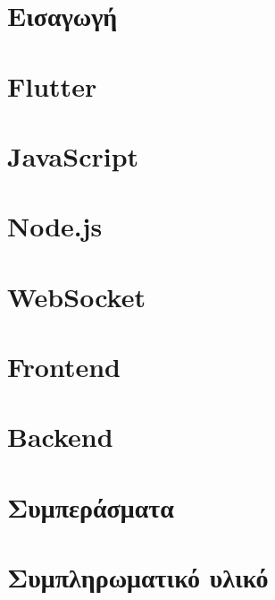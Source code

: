 \documentclass[a4paper, 11pt]{report}
\begin{document}
\chapter{Εισαγωγή}


\chapter{Flutter}


\chapter{JavaScript}


\chapter{Node.js}


\chapter{WebSocket}


\chapter{Frontend}


\chapter{Backend}

\chapter{Συμπεράσματα}


\appendix
\chapter{Συμπληρωματικό υλικό}


\printbibliography
\end{document}
